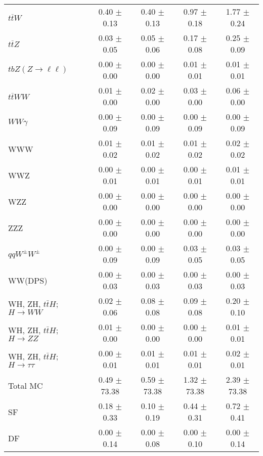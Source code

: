 \begin{tabular}{l|cccc}
                   $t\overline{t}W$ &  0.40 $\pm$  0.13 &  0.40 $\pm$  0.13 &  0.97 $\pm$  0.18 &  1.77 $\pm$  0.24 \\
                   $t\overline{t}Z$ &  0.03 $\pm$  0.05 &  0.05 $\pm$  0.06 &  0.17 $\pm$  0.08 &  0.25 $\pm$  0.09 \\
    $tbZ (Z \rightarrow \ell \ell)$ &  0.00 $\pm$  0.00 &  0.00 $\pm$  0.00 &  0.01 $\pm$  0.01 &  0.01 $\pm$  0.01 \\
                  $t\overline{t}WW$ &  0.01 $\pm$  0.00 &  0.02 $\pm$  0.00 &  0.03 $\pm$  0.00 &  0.06 $\pm$  0.00 \\
                         $WW\gamma$ &  0.00 $\pm$  0.09 &  0.00 $\pm$  0.09 &  0.00 $\pm$  0.09 &  0.00 $\pm$  0.09 \\
                                WWW &  0.01 $\pm$  0.02 &  0.01 $\pm$  0.02 &  0.01 $\pm$  0.02 &  0.02 $\pm$  0.02 \\
                                WWZ &  0.00 $\pm$  0.01 &  0.00 $\pm$  0.01 &  0.00 $\pm$  0.01 &  0.01 $\pm$  0.01 \\
                                WZZ &  0.00 $\pm$  0.00 &  0.00 $\pm$  0.00 &  0.00 $\pm$  0.00 &  0.00 $\pm$  0.00 \\
                                ZZZ &  0.00 $\pm$  0.00 &  0.00 $\pm$  0.00 &  0.00 $\pm$  0.00 &  0.00 $\pm$  0.00 \\
                 $qqW^{\pm}W^{\pm}$ &  0.00 $\pm$  0.09 &  0.00 $\pm$  0.09 &  0.03 $\pm$  0.05 &  0.03 $\pm$  0.05 \\
                            WW(DPS) &  0.00 $\pm$  0.03 &  0.00 $\pm$  0.03 &  0.00 $\pm$  0.03 &  0.00 $\pm$  0.03 \\
WH, ZH, $t\bar{t}H$; $H \rightarrow WW$ &  0.02 $\pm$  0.06 &  0.08 $\pm$  0.08 &  0.09 $\pm$  0.08 &  0.20 $\pm$  0.10 \\
WH, ZH, $t\bar{t}H$; $H \rightarrow ZZ$ &  0.01 $\pm$  0.00 &  0.00 $\pm$  0.00 &  0.00 $\pm$  0.00 &  0.01 $\pm$  0.01 \\
WH, ZH, $t\bar{t}H$; $H \rightarrow \tau\tau$ &  0.00 $\pm$  0.01 &  0.01 $\pm$  0.01 &  0.01 $\pm$  0.01 &  0.02 $\pm$  0.01 \\
\hline\hline
                           Total MC &  0.49 $\pm$ 73.38 &  0.59 $\pm$ 73.38 &  1.32 $\pm$ 73.38 &  2.39 $\pm$ 73.38 \\
\hline
                                 SF &  0.18 $\pm$  0.33 &  0.10 $\pm$  0.19 &  0.44 $\pm$  0.31 &  0.72 $\pm$  0.41 \\
                                 DF &  0.00 $\pm$  0.14 &  0.00 $\pm$  0.08 &  0.00 $\pm$  0.10 &  0.00 $\pm$  0.14 \\

\end{tabular}
